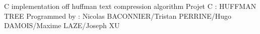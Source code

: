 C implementation off huffman text compression algorithm Projet C \+: H\+U\+F\+F\+M\+AN T\+R\+EE Programmed by \+: Nicolas B\+A\+C\+O\+N\+N\+I\+E\+R/\+Tristan P\+E\+R\+R\+I\+N\+E/\+Hugo D\+A\+M\+O\+I\+S/\+Maxime L\+A\+Z\+E/\+Joseph XU 